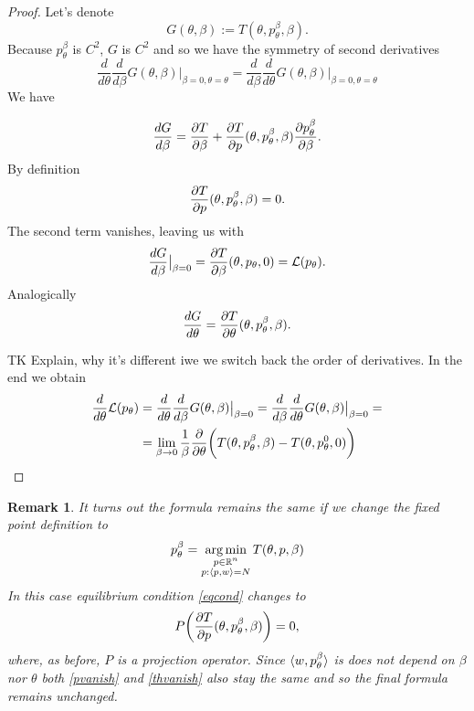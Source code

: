 \documentclass[a4paper,10pt]{report}
\newtheorem{remark}{Remark}
\begin{document}
\begin{proof} Let's denote
 \begin{equation}
 G(\theta, \beta) := T(\theta, p_\theta^\beta, \beta).
\end{equation}
Because $p_\theta^\beta$ is $C^2$, $G$ is $C^2$ and so we have the symmetry of second derivatives
\begin{equation}
 \frac{d}{d\theta}\frac{d}{d\beta}G(\theta,\beta)\big|_{\beta=0, \theta = \theta} =\frac{d}{d\beta}\frac{d}{d\theta}G(\theta,\beta)\big|_{\beta=0, \theta = \theta}
\end{equation}
We have

\begin{equation}\label{eqcond}
 \frac{dG}{d\beta} = \frac{\partial T}{\partial \beta} + \frac{\partial T}{\partial p}(\theta,p_\theta^{\beta}, \beta)\frac{\partial p_\theta^{\beta}}{\partial \beta}.
\end{equation}
By definition
\begin{equation}
\frac{\partial T}{\partial p}(\theta,p_\theta^{\beta}, \beta)=0.
\end{equation}
The second term vanishes, leaving us with
\begin{equation}\label{pvanish}
  \frac{dG}{d\beta}\big|_{\beta=0} = \frac{\partial T}{\partial \beta}(\theta, p_\theta, 0)=\mathcal{L}(p_\theta).
\end{equation}
Analogically
\begin{equation}\label{thvanish}
 \frac{dG}{d\theta}=\frac{\partial T}{\partial \theta}(\theta, p_\theta^{\beta}, \beta).
\end{equation}

TK Explain, why it's different iwe we switch back the order of derivatives.
In the end we obtain
\begin{align}
 \frac{d}{d\theta} \mathcal{L}(p_\theta) &=\frac{d}{d\theta}\frac{d}{d\beta}G(\theta,\beta)\big|_{\beta=0} = \frac{d}{d\beta}\frac{d}{d\theta}G(\theta,\beta)\big|_{\beta=0}=\\
 &=\lim_{\beta \to 0}\frac{1}{\beta} \frac{\partial }{\partial \theta} \bigg(T(\theta, p_\theta^\beta,\beta) - T(\theta, p_\theta^0, 0)\bigg)
\end{align}

\end{proof}

\begin{remark}
 It turns out the formula remains the same if we change the fixed point definition to
\begin{equation}
 p_\theta^\beta = \operatorname*{arg\,min}_{\substack{p \in \mathbb{R}^n \\ p: \langle p, w \rangle=N }} T(\theta, p, \beta)
\end{equation}
In this case equilibrium condition \ref{eqcond} changes to
\begin{equation*}
P\bigg(\frac{\partial T}{\partial p}(\theta,p_\theta^{\beta}, \beta)\bigg)=0,
\end{equation*}
where, as before, $P$ is a projection operator. Since $\langle w, p_\theta^{\beta} \rangle$ is does not depend on $\beta$ nor $\theta$ both \ref{pvanish} and \ref{thvanish} also stay the same and so the final formula remains unchanged.

\end{remark}
\end{document}
